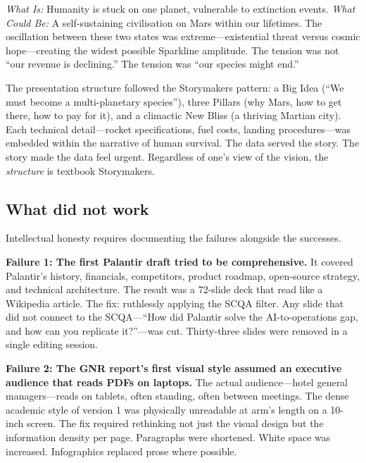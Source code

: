 \emph{What Is:} Humanity is stuck on one planet, vulnerable to extinction events. \emph{What Could Be:} A self-sustaining civilisation on Mars within our lifetimes. The oscillation between these two states was extreme---existential threat versus cosmic hope---creating the widest possible Sparkline amplitude. The tension was not ``our revenue is declining.'' The tension was ``our species might end.''

The presentation structure followed the Storymakers pattern: a Big Idea (``We must become a multi-planetary species''), three Pillars (why Mars, how to get there, how to pay for it), and a climactic New Bliss (a thriving Martian city). Each technical detail---rocket specifications, fuel costs, landing procedures---was embedded within the narrative of human survival. The data served the story. The story made the data feel urgent. Regardless of one's view of the vision, the \emph{structure} is textbook Storymakers.

\subsection{What did not work}

Intellectual honesty requires documenting the failures alongside the successes.

\textbf{Failure 1: The first Palantir draft tried to be comprehensive.} It covered Palantir's history, financials, competitors, product roadmap, open-source strategy, and technical architecture. The result was a 72-slide deck that read like a Wikipedia article. The fix: ruthlessly applying the SCQA filter. Any slide that did not connect to the SCQA---``How did Palantir solve the AI-to-operations gap, and how can you replicate it?''---was cut. Thirty-three slides were removed in a single editing session.

\textbf{Failure 2: The GNR report's first visual style assumed an executive audience that reads PDFs on laptops.} The actual audience---hotel general managers---reads on tablets, often standing, often between meetings. The dense academic style of version 1 was physically unreadable at arm's length on a 10-inch screen. The fix required rethinking not just the visual design but the information density per page. Paragraphs were shortened. White space was increased. Infographics replaced prose where possible.

